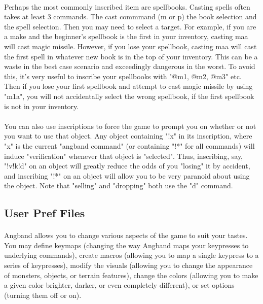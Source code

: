\paragraph{}Perhaps the most commonly inscribed item are spellbooks. Casting
spells often takes at least 3 commands. The cast commmand (m or p) the
book selection and the spell selection. Then you may need to select a
target. For example, if you are a make and the beginner's spellbook is the
first in your inventory, casting maa will cast magic missile. However, if
you lose your spellbook, casting maa will cast the first spell in whatever
new book is in the top of your inventory. This can be a waste in the best
case scenario and exceedingly dangerous in the worst. To avoid this, it's
very useful to inscribe your spellbooks with "@m1, @m2, @m3" etc. Then if
you lose your first spellbook and attempt to cast magic missile by using
"m1a", you will not accidentally select the wrong spellbook, if the first
spellbook is not in your inventory.

\paragraph{}You can also use inscriptions to force the game to prompt you on
whether or not you want to use that object. Any object containing "!x" in
its inscription, where "x" is the current "angband command" (or containing
"!*" for all commands) will induce "verification" whenever that object is
"selected". Thus, inscribing, say, "!v!k!d" on an object will greatly reduce
the odds of you "losing" it by accident, and inscribing "!*" on an object will
allow you to be very paranoid about using the object. Note that "selling"
and "dropping" both use the "d" command.

\subsection{User Pref Files}
\paragraph{}Angband allows you to change various aspects of the game to suit
your tastes. You may define keymaps (changing the way Angband maps your
keypresses to underlying commands), create macros (allowing you to map a
single keypress to a series of keypresses), modify the visuals (allowing
you to change the appearance of monsters, objects, or terrain features),
change the colors (allowing you to make a given color brighter, darker,
or even completely different), or set options (turning them off or on).


